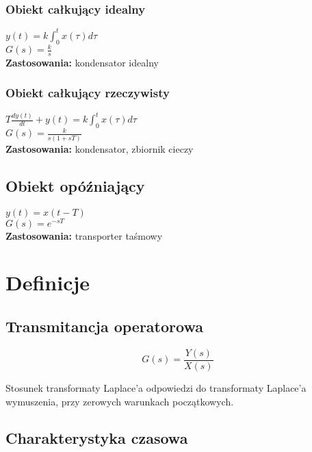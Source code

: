 \documentclass[11pt]{article}
\begin{document}
\subsubsection{Obiekt całkujący idealny}

$y(t) = k \int_0^t x(\tau) d\tau$\\

$G(s) = \frac{k}{s}$\\

\textbf{Zastosowania:} kondensator idealny

\subsubsection{Obiekt całkujący rzeczywisty}

$T \frac{dy(t)}{dt} + y(t) = k \int_0^t x(\tau) d\tau$\\

$G(s) = \frac{k}{s(1 + sT)}$\\

\textbf{Zastosowania:} kondensator, zbiornik cieczy


\subsection{Obiekt opóźniający}

$y(t) = x(t-T)$\\

$G(s) = e^{-sT}$\\

\textbf{Zastosowania:} transporter taśmowy



\pagebreak

\section{Definicje}

\subsection{Transmitancja operatorowa}

$$G(s) = \frac{Y(s)}{X(s)}$$

Stosunek transformaty Laplace'a odpowiedzi do transformaty Laplace'a wymuszenia, przy zerowych warunkach początkowych.


\subsection{Charakterystyka czasowa}
\end{document}
